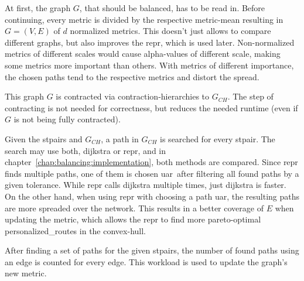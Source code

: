         At first, the graph $G$, that should be balanced, has to be read in.
        Before continuing, every \gls{metric} is divided by the respective \gls{metric}-mean resulting in $G = (V, E)$ of $d$ normalized \glspl{metric}.
        This doesn't just allows to compare different graphs, but also improves the \gls{repr}, which is used later.
        Non-normalized \glspl{metric} of different scales would cause \gls{alpha}-values of different scale, making some \glspl{metric} more important than others.
        With \glspl{metric} of different importance, the chosen paths tend to the respective \glspl{metric} and distort the spread.

        This graph $G$ is contracted via \gls{contraction-hierarchies} to $G_{CH}$.
        The step of contracting is not needed for correctness, but reduces the needed runtime (even if $G$ is not being fully contracted).

        Given the \glspl{stpair} and $G_{CH}$, a path in $G_{CH}$ is searched for every \gls{stpair}.
        The search may use both, \gls{dijkstra} or \gls{repr}, and in chapter~\ref{chap:balancing:implementation}, both methods are compared.
        Since \gls{repr} finds multiple paths, one of them is chosen \gls{uar}\ after filtering all found paths by a given tolerance.
        While \gls{repr} calls \gls{dijkstra} multiple times, just \gls{dijkstra} is faster.
        On the other hand, when using \gls{repr} with choosing a path \gls{uar}, the resulting paths are more spreaded over the network.
        This results in a better coverage of $E$ when updating the metric, which allows the \gls{repr} to find more pareto-optimal \glspl{personalized_route} in the convex-hull.

        After finding a set of paths for the given \glspl{stpair}, the number of found paths using an edge is counted for every edge.
        This workload is used to update the graph's new \gls{metric}.




